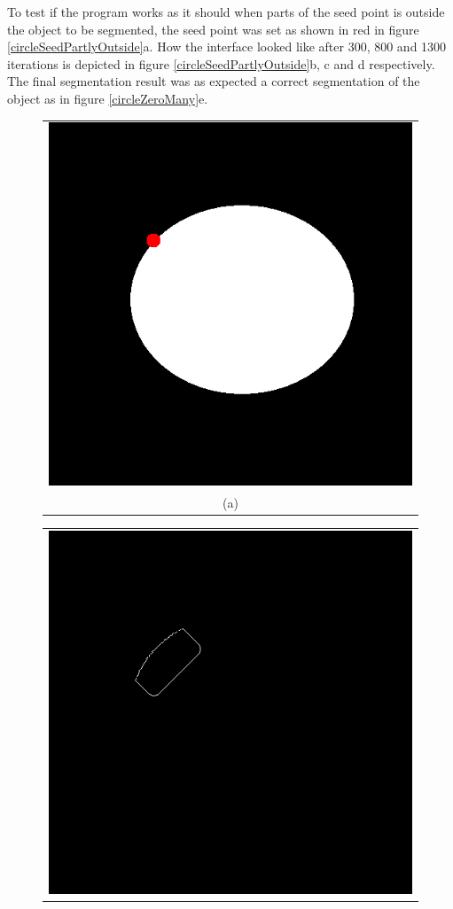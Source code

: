 To test if the program works as it should when parts of the seed point is outside the object to be segmented, the seed point was set as shown in red in figure \ref{circleSeedPartlyOutside}a. How the interface looked like after 300, 800 and 1300 iterations is depicted in figure \ref{circleSeedPartlyOutside}b, c and d respectively. The final segmentation result was as expected a correct segmentation of the object as in figure \ref{circleZeroMany}e. 
\begin{figure}[h!]
\centering
\begin{minipage}{.49\textwidth}
\begin{tabular}{c}
\includegraphics[width=.9\textwidth]{results/2D/circleSeedPartlyOutside} \\
(a)
\end{tabular}
\end{minipage}
\begin{minipage}{.49\textwidth}
\begin{tabular}{c}
\includegraphics[width=.9\textwidth]{results/2D/circleSeedPartlyOutside300} \\

\end{tabular}
\end{minipage}
\end{figure}
